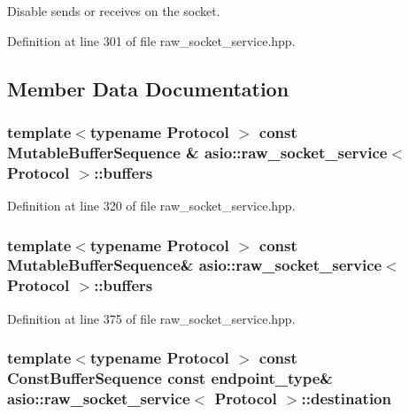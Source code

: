 Disable sends or receives on the socket. 



Definition at line 301 of file raw\+\_\+socket\+\_\+service.\+hpp.



\subsection{Member Data Documentation}
\hypertarget{classasio_1_1raw__socket__service_a45cf013e3c3889296ee65fd303253db6}{}
\subsubsection[{buffers}]{\setlength{\rightskip}{0pt plus 5cm}template$<$typename Protocol $>$ const Mutable\+Buffer\+Sequence \& {\bf asio\+::raw\+\_\+socket\+\_\+service}$<$ Protocol $>$\+::buffers}\label{classasio_1_1raw__socket__service_a45cf013e3c3889296ee65fd303253db6}


Definition at line 320 of file raw\+\_\+socket\+\_\+service.\+hpp.

\hypertarget{classasio_1_1raw__socket__service_aaa3ea28d6710a8dc189c9cea10d362a0}{}
\subsubsection[{buffers}]{\setlength{\rightskip}{0pt plus 5cm}template$<$typename Protocol $>$ const Mutable\+Buffer\+Sequence\& {\bf asio\+::raw\+\_\+socket\+\_\+service}$<$ Protocol $>$\+::buffers}\label{classasio_1_1raw__socket__service_aaa3ea28d6710a8dc189c9cea10d362a0}


Definition at line 375 of file raw\+\_\+socket\+\_\+service.\+hpp.

\hypertarget{classasio_1_1raw__socket__service_a862ad7c956d71979dbe3702d78540643}{}
\subsubsection[{destination}]{\setlength{\rightskip}{0pt plus 5cm}template$<$typename Protocol $>$ const Const\+Buffer\+Sequence const {\bf endpoint\+\_\+type}\& {\bf asio\+::raw\+\_\+socket\+\_\+service}$<$ Protocol $>$\+::destination}\label{classasio_1_1raw__socket__service_a862ad7c956d71979dbe3702d78540643}


